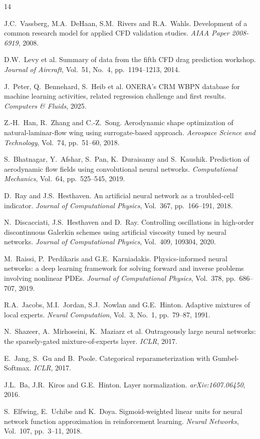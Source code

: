 \documentclass{WCCM-ECCOMAS_2026_Full_Paper}
\begin{document}
\begin{thebibliography}{14}
\setlength{\itemsep}{0pt}\setlength{\parsep}{0pt}\setlength{\parskip}{0pt}
\setlength{\itemsep}{0pt}\setlength{\parsep}{0pt}

J.C.~Vassberg, M.A.~DeHaan, S.M.~Rivers and R.A.~Wahls.
Development of a common research model for applied CFD validation
studies. \textit{AIAA Paper 2008-6919}, 2008.

D.W.~Levy et al.
Summary of data from the fifth CFD drag prediction workshop.
\textit{Journal of Aircraft}, Vol.~51, No.~4, pp.~1194--1213, 2014.

J.~Peter, Q.~Bennehard, S.~Heib et al.
ONERA's CRM WBPN database for machine learning activities, related
regression challenge and first results.
\textit{Computers \& Fluids}, 2025.

Z.-H.~Han, R.~Zhang and C.-Z.~Song.
Aerodynamic shape optimization of natural-laminar-flow wing using
surrogate-based approach.
\textit{Aerospace Science and Technology}, Vol.~74, pp.~51--60, 2018.

S.~Bhatnagar, Y.~Afshar, S.~Pan, K.~Duraisamy and S.~Kaushik.
Prediction of aerodynamic flow fields using convolutional neural
networks. \textit{Computational Mechanics}, Vol.~64, pp.~525--545, 2019.

D.~Ray and J.S.~Hesthaven.
An artificial neural network as a troubled-cell indicator.
\textit{Journal of Computational Physics}, Vol.~367, pp.~166--191, 2018.

N.~Discacciati, J.S.~Hesthaven and D.~Ray.
Controlling oscillations in high-order discontinuous Galerkin schemes
using artificial viscosity tuned by neural networks.
\textit{Journal of Computational Physics}, Vol.~409, 109304, 2020.

M.~Raissi, P.~Perdikaris and G.E.~Karniadakis.
Physics-informed neural networks: a deep learning framework for
solving forward and inverse problems involving nonlinear PDEs.
\textit{Journal of Computational Physics}, Vol.~378, pp.~686--707, 2019.

R.A.~Jacobs, M.I.~Jordan, S.J.~Nowlan and G.E.~Hinton.
Adaptive mixtures of local experts.
\textit{Neural Computation}, Vol.~3, No.~1, pp.~79--87, 1991.

N.~Shazeer, A.~Mirhoseini, K.~Maziarz et al.
Outrageously large neural networks: the sparsely-gated
mixture-of-experts layer. \textit{ICLR}, 2017.

E.~Jang, S.~Gu and B.~Poole.
Categorical reparameterization with Gumbel-Softmax. \textit{ICLR}, 2017.

J.L.~Ba, J.R.~Kiros and G.E.~Hinton.
Layer normalization. \textit{arXiv:1607.06450}, 2016.

S.~Elfwing, E.~Uchibe and K.~Doya.
Sigmoid-weighted linear units for neural network function
approximation in reinforcement learning.
\textit{Neural Networks}, Vol.~107, pp.~3--11, 2018.
\end{thebibliography}
\end{document}
